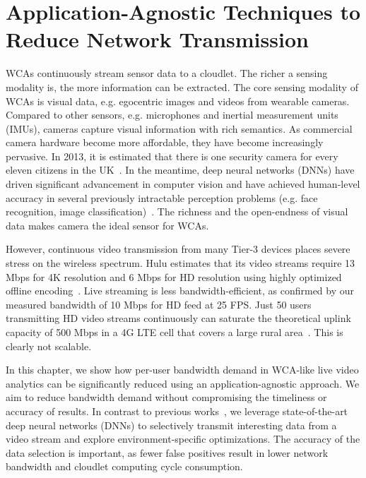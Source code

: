 \chapter{Application-Agnostic Techniques to Reduce Network Transmission}
\label{chapter: bandwidth}

WCAs continuously stream sensor data to a cloudlet. The richer a sensing
modality is, the more information can be extracted. The core sensing modality of
WCAs is visual data, e.g. egocentric images and videos from wearable cameras.
Compared to other sensors, e.g. microphones and inertial measurement units
(IMUs), cameras capture visual information with rich semantics. As commercial
camera hardware become more affordable, they have become increasingly pervasive.
In 2013, it is estimated that there is one security camera for every eleven
citizens in the UK~\cite{Barrett2013}. In the meantime, deep neural networks
(DNNs) have driven significant advancement in computer vision and have achieved
human-level accuracy in several previously intractable perception problems (e.g.
face recognition, image classification)~\cite{learned2016labeled,
schroff2015facenet}. The richness and the open-endness of visual data makes
camera the ideal sensor for WCAs.

However, continuous video transmission from many Tier-3 devices places severe
stress on the wireless spectrum.  Hulu estimates that its video streams require
13 Mbps for 4K resolution and 6 Mbps for HD resolution using highly optimized
offline encoding~\cite{Hulu2017}. Live streaming is less bandwidth-efficient, as
confirmed by our measured bandwidth of 10 Mbps for HD feed at 25 FPS. Just 50
users transmitting HD video streams continuously can saturate the theoretical
uplink capacity of 500 Mbps in a 4G LTE cell that covers a large rural
area~\cite{LteWorld2009}.  This is clearly not scalable.

In this chapter, we show how per-user bandwidth demand in WCA-like live video
analytics can be significantly reduced using an application-agnostic approach.
We aim to reduce bandwidth demand without compromising the timeliness or
accuracy of results. In contrast to previous
works~\cite{Wang2017networked,zhang2015design,Wang2016skyeyes}, we leverage
state-of-the-art deep neural networks (DNNs) to selectively transmit interesting
data from a video stream and explore environment-specific optimizations. The
accuracy of the data selection is important, as fewer false positives result in
lower network bandwidth and cloudlet computing cycle consumption.

